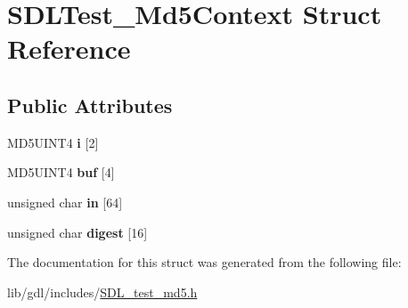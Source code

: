 \hypertarget{struct_s_d_l_test___md5_context}{}\section{S\+D\+L\+Test\+\_\+\+Md5\+Context Struct Reference}
\label{struct_s_d_l_test___md5_context}
\subsection*{Public Attributes}
\begin{DoxyCompactItemize}
\item 
\hypertarget{struct_s_d_l_test___md5_context_a95b3d5fd74fd1b7a27bf96f3bb32beb4}{}M\+D5\+U\+I\+N\+T4 {\bfseries i} \mbox{[}2\mbox{]}\label{struct_s_d_l_test___md5_context_a95b3d5fd74fd1b7a27bf96f3bb32beb4}

\item 
\hypertarget{struct_s_d_l_test___md5_context_a061f0cead7ec49ac4c5baf0bbd9c13a7}{}M\+D5\+U\+I\+N\+T4 {\bfseries buf} \mbox{[}4\mbox{]}\label{struct_s_d_l_test___md5_context_a061f0cead7ec49ac4c5baf0bbd9c13a7}

\item 
\hypertarget{struct_s_d_l_test___md5_context_a337638ef799dc0ad9397ea9b175ea388}{}unsigned char {\bfseries in} \mbox{[}64\mbox{]}\label{struct_s_d_l_test___md5_context_a337638ef799dc0ad9397ea9b175ea388}

\item 
\hypertarget{struct_s_d_l_test___md5_context_ab29079997a9f35e5d52c2aac3ad28f90}{}unsigned char {\bfseries digest} \mbox{[}16\mbox{]}\label{struct_s_d_l_test___md5_context_ab29079997a9f35e5d52c2aac3ad28f90}

\end{DoxyCompactItemize}


The documentation for this struct was generated from the following file\+:\begin{DoxyCompactItemize}
\item 
lib/gdl/includes/\hyperlink{_s_d_l__test__md5_8h}{S\+D\+L\+\_\+test\+\_\+md5.\+h}\end{DoxyCompactItemize}
